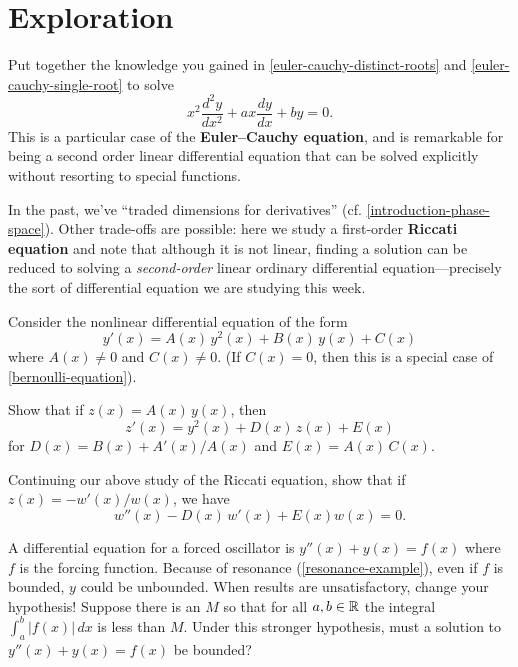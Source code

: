 \documentclass{homework}
\begin{document}
\section{Exploration}

\begin{problem}\label{second-order-euler-cauchy}Put together the knowledge you gained in \ref{euler-cauchy-distinct-roots} and \ref{euler-cauchy-single-root} to solve
  \[
    x^{2}{\frac {d^{2}y}{dx^{2}}}+ax{\frac {dy}{dx}}+by=0.
  \]
  This is a particular case of the \textbf{Euler--Cauchy equation},
  and is remarkable for being a second order linear differential
  equation that can be solved explicitly without resorting to special
  functions.
\end{problem}

\begin{problem}\label{riccati-equation}In the past, we've ``traded dimensions for derivatives'' (cf. \ref{introduction-phase-space}).  Other trade-offs are
  possible: here we study a first-order \textbf{Riccati equation} and
  note that although it is not linear, finding a solution can be
  reduced to solving a \textit{second-order} linear ordinary
  differential equation---precisely the sort of differential equation
  we are studying this week.

  Consider the nonlinear differential equation of the form
  \[
    y'(x)=A(x)\,y^{2}(x) + B(x)\,y(x) + C(x)
  \]
  where $A(x) \neq 0$ and $C(x) \neq 0$.  (If $C(x) = 0$, then this is
  a special case of \ref{bernoulli-equation}).

  Show that if $z(x) = A(x) \, y(x)$, then
  \[
    z'(x)=y^{2}(x) + D(x)\,z(x) + E(x)
  \]
  for $D(x) = B(x) + A'(x)/A(x)$ and $E(x) = A(x) \, C(x)$.
\end{problem}
  
\begin{problem}\label{more-ricatti}Continuing our above study of the Riccati equation,
  show that if $z(x) = -w'(x)/w(x)$, we have
  \[
    w''(x) - D(x) \, w'(x) + E(x) w(x) = 0.
  \]
\end{problem}

\begin{problem}
  A differential equation for a forced oscillator is
  $y''(x) + y(x) = f(x)$ where $f$ is the forcing function.  Because
  of resonance (\ref{resonance-example}), even if $f$ is bounded, $y$
  could be unbounded.  When results are unsatisfactory, change your
  hypothesis!  Suppose there is an $M$ so that for all $a, b \in \mathbb{R}$
  the integral $\int_a^b \left|f(x)\right| \, dx$ is less than $M$.
  Under this stronger hypothesis, must a solution to
  $y''(x) + y(x) = f(x)$ be bounded?
\end{problem}
\end{document}
